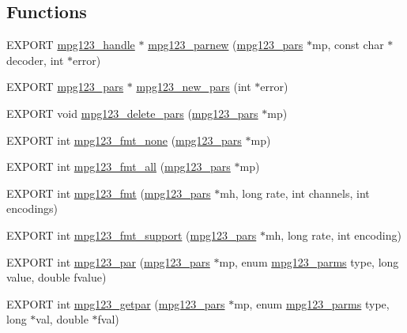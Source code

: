 \subsection*{Functions}
\begin{DoxyCompactItemize}
\item 
E\+X\+P\+O\+RT \hyperlink{group__mpg123__init_ga6728e2839a395f3a07d4514da659faca}{mpg123\+\_\+handle} $\ast$ \hyperlink{group__mpg123__advpar_gac821d9eb625a70c1d30a3a14a211f2d2}{mpg123\+\_\+parnew} (\hyperlink{group__mpg123__advpar_ga3983578625af3bb6dc7e3b74d0cab4aa}{mpg123\+\_\+pars} $\ast$mp, const char $\ast$decoder, int $\ast$error)
\item 
E\+X\+P\+O\+RT \hyperlink{group__mpg123__advpar_ga3983578625af3bb6dc7e3b74d0cab4aa}{mpg123\+\_\+pars} $\ast$ \hyperlink{group__mpg123__advpar_ga4ca3810b635b11e97aa3253d97029948}{mpg123\+\_\+new\+\_\+pars} (int $\ast$error)
\item 
E\+X\+P\+O\+RT void \hyperlink{group__mpg123__advpar_gae2b9963cd5295f736db026dbe2c2e1a3}{mpg123\+\_\+delete\+\_\+pars} (\hyperlink{group__mpg123__advpar_ga3983578625af3bb6dc7e3b74d0cab4aa}{mpg123\+\_\+pars} $\ast$mp)
\item 
E\+X\+P\+O\+RT int \hyperlink{group__mpg123__advpar_gaf84d9ade7166f3b41c70e457b71b1b38}{mpg123\+\_\+fmt\+\_\+none} (\hyperlink{group__mpg123__advpar_ga3983578625af3bb6dc7e3b74d0cab4aa}{mpg123\+\_\+pars} $\ast$mp)
\item 
E\+X\+P\+O\+RT int \hyperlink{group__mpg123__advpar_ga9712fbe0f36a29d4c38a1c96a333083a}{mpg123\+\_\+fmt\+\_\+all} (\hyperlink{group__mpg123__advpar_ga3983578625af3bb6dc7e3b74d0cab4aa}{mpg123\+\_\+pars} $\ast$mp)
\item 
E\+X\+P\+O\+RT int \hyperlink{group__mpg123__advpar_ga0a4e4931437176e1365a98d5af921a6a}{mpg123\+\_\+fmt} (\hyperlink{group__mpg123__advpar_ga3983578625af3bb6dc7e3b74d0cab4aa}{mpg123\+\_\+pars} $\ast$mh, long rate, int channels, int encodings)
\item 
E\+X\+P\+O\+RT int \hyperlink{group__mpg123__advpar_ga26bfa94065adbda219b0ef4572385293}{mpg123\+\_\+fmt\+\_\+support} (\hyperlink{group__mpg123__advpar_ga3983578625af3bb6dc7e3b74d0cab4aa}{mpg123\+\_\+pars} $\ast$mh, long rate, int encoding)
\item 
E\+X\+P\+O\+RT int \hyperlink{group__mpg123__advpar_ga1264032012d421572198dda37ed88bd2}{mpg123\+\_\+par} (\hyperlink{group__mpg123__advpar_ga3983578625af3bb6dc7e3b74d0cab4aa}{mpg123\+\_\+pars} $\ast$mp, enum \hyperlink{group__mpg123__init_ga73a8ff3363028b89afc72b3ea032b9cb}{mpg123\+\_\+parms} type, long value, double fvalue)
\item 
E\+X\+P\+O\+RT int \hyperlink{group__mpg123__advpar_gac8aef7a3971c4617022e288b3fa12285}{mpg123\+\_\+getpar} (\hyperlink{group__mpg123__advpar_ga3983578625af3bb6dc7e3b74d0cab4aa}{mpg123\+\_\+pars} $\ast$mp, enum \hyperlink{group__mpg123__init_ga73a8ff3363028b89afc72b3ea032b9cb}{mpg123\+\_\+parms} type, long $\ast$val, double $\ast$fval)
\end{DoxyCompactItemize}


